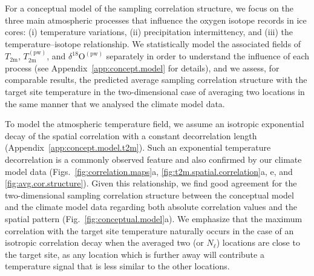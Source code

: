 \documentclass[cp]{copernicus}
\begin{document}
For a conceptual model of the sampling correlation structure, we focus on the
three main atmospheric processes that influence the oxygen isotope records in
ice cores: (i) temperature variations, (ii) precipitation intermittency, and
(iii) the temperature--isotope relationship. We statistically model the
associated fields of $T_{\mathrm{2m}}$, $T_{2\mathrm{m}}^{\mathrm{(pw)}}$, and
$\delta^{18}\mathrm{O}^{\mathrm{(pw)}}$ separately in order to understand the
influence of each process (see Appendix~\ref{app:concept.model} for details),
and we assess, for comparable results, the predicted average sampling
correlation structure with the target site temperature in the two-dimensional
case of averaging two locations in the same manner that we analysed the climate
model data.

To model the atmospheric temperature field, we assume an isotropic exponential
decay of the spatial correlation with a constant decorrelation length
(Appendix~\ref{app:concept.model.t2m}). Such an exponential temperature
decorrelation is a commonly observed feature \citep{Jones1997} and also
confirmed by our climate model data (Figs.~\ref{fig:correlation.maps}a,
\ref{fig:t2m.spatial.correlation}a, e, and \ref{fig:avg.cor.structure}). Given
this relationship, we find good agreement for the two-dimensional sampling
correlation structure between the conceptual model and the climate model data
regarding both absolute correlation values and the spatial pattern
(Fig.~\ref{fig:conceptual.model}a). We emphasize that the maximum correlation
with the target site temperature naturally occurs in the case of an isotropic
correlation decay when the averaged two (or $N_{\ell}$) locations are close to
the target site, as any location which is further away will contribute a
temperature signal that is less similar to the other locations.
\end{document}
